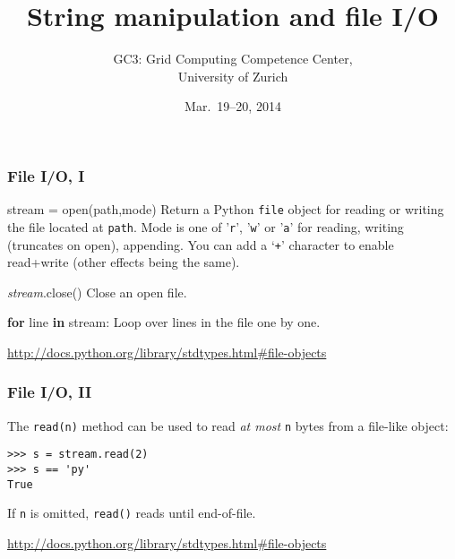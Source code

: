 \documentclass[english,serif,mathserif,xcolor=pdftex,dvipsnames,table]{beamer}
\title[Part 4]{%
  String manipulation and file I/O
}
\author[GC3]{%
  GC3: Grid Computing Competence Center, \\
  University of Zurich
}
\date{Mar.~19--20, 2014}
\begin{document}
\maketitle

\begin{frame}[fragile]
  \frametitle{File I/O, I}

  \begin{describe}{\ttfamily stream = open(path,mode)}
    Return a Python \texttt{file} object for reading or writing the
    file located at \texttt{path}.  Mode is one of '\texttt{r}',
    '\texttt{w}' or '\texttt{a}' for reading, writing (truncates on open), appending.
    You can add a `\texttt{+}' character to enable read+write (other
    effects being the same).
  \end{describe}

  \begin{describe}{\ttfamily \emph{stream}.close()}
    Close an open file.
  \end{describe}

  \begin{describe}{\ttfamily \textbf{for} line \textbf{in} stream:}
    Loop over lines in the file one by one.
  \end{describe}

  \begin{references}
    \url{http://docs.python.org/library/stdtypes.html#file-objects}
  \end{references}
\end{frame}


\begin{frame}[fragile]
  \frametitle{File I/O, II}

  The \lstinline|read(n)| method can be used to read \emph{at most}
  \lstinline|n| bytes from a file-like object:
\begin{lstlisting}
>>> s = stream.read(2)
>>> s == 'py'
True
\end{lstlisting}
  If \lstinline|n| is omitted, \texttt{read()} reads until end-of-file.

  \begin{references}
    \url{http://docs.python.org/library/stdtypes.html#file-objects}
  \end{references}
\end{frame}
\end{document}
